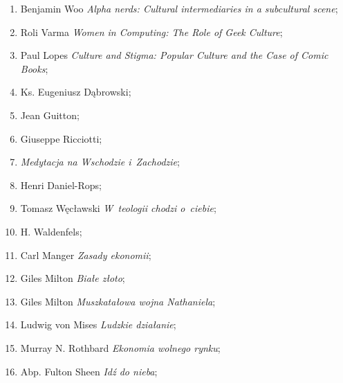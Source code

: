 \documentclass[a4paper,11pt]{article}
\begin{document}
\begin{enumerate}
\item Benjamin Woo \textit{Alpha nerds: Cultural intermediaries in a
    subcultural scene};



\item Roli Varma \textit{Women in Computing: The Role of Geek Culture};



\item Paul Lopes \textit{Culture and Stigma: Popular Culture and the Case
    of Comic Books};



\item Ks. Eugeniusz Dąbrowski;



\item Jean Guitton;



\item Giuseppe Ricciotti;



\item \textit{Medytacja na Wschodzie i~Zachodzie};



\item Henri Daniel-Rops;



\item Tomasz Węcławski \textit{W~teologii chodzi o~ciebie};



\item H. Waldenfels;



\item Carl Manger \textit{Zasady ekonomii};



\item Giles Milton \textit{Białe złoto};



\item Giles Milton \textit{Muszkatałowa wojna Nathaniela};



\item Ludwig von Mises \textit{Ludzkie działanie};



\item Murray N. Rothbard \textit{Ekonomia wolnego rynku};



\item Abp. Fulton Sheen \textit{Idź do nieba};




\end{enumerate}
\end{document}
